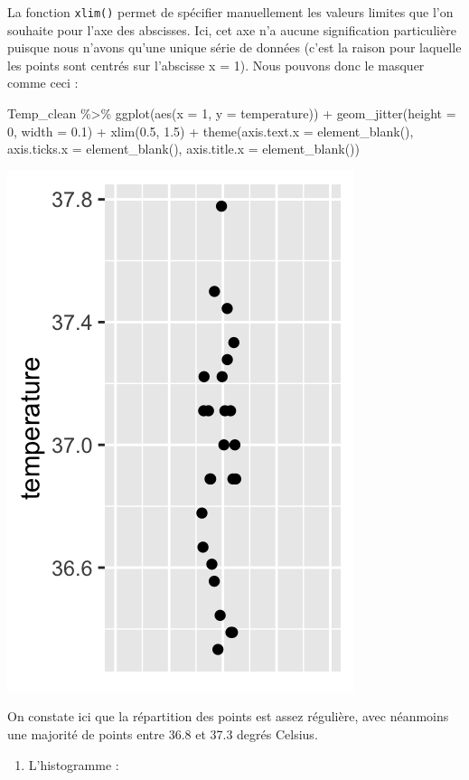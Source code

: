\documentclass[
  a4paper,
]{article}
\newenvironment{Shaded}{\begin{snugshade}}{\end{snugshade}}
\newcommand{\AttributeTok}[1]{\textcolor[rgb]{0.00,0.34,0.68}{#1}}
\newcommand{\DecValTok}[1]{\textcolor[rgb]{0.69,0.50,0.00}{#1}}
\newcommand{\FloatTok}[1]{\textcolor[rgb]{0.69,0.50,0.00}{#1}}
\newcommand{\FunctionTok}[1]{\textcolor[rgb]{0.39,0.29,0.61}{#1}}
\newcommand{\NormalTok}[1]{\textcolor[rgb]{0.12,0.11,0.11}{#1}}
\newcommand{\SpecialCharTok}[1]{\textcolor[rgb]{0.24,0.68,0.91}{#1}}
\providecommand{\tightlist}{%
  \setlength{\itemsep}{0pt}\setlength{\parskip}{0pt}}
\begin{document}
La fonction \texttt{xlim()} permet de spécifier manuellement les valeurs limites que l'on souhaite pour l'axe des abscisses. Ici, cet axe n'a aucune signification particulière puisque nous n'avons qu'une unique série de données (c'est la raison pour laquelle les points sont centrés sur l'abscisse x = 1). Nous pouvons donc le masquer comme ceci :

\begin{Shaded}
\begin{Highlighting}[]
\NormalTok{Temp\_clean }\SpecialCharTok{\%\textgreater{}\%} 
  \FunctionTok{ggplot}\NormalTok{(}\FunctionTok{aes}\NormalTok{(}\AttributeTok{x =} \DecValTok{1}\NormalTok{, }\AttributeTok{y =}\NormalTok{ temperature)) }\SpecialCharTok{+}
  \FunctionTok{geom\_jitter}\NormalTok{(}\AttributeTok{height =} \DecValTok{0}\NormalTok{, }\AttributeTok{width =} \FloatTok{0.1}\NormalTok{) }\SpecialCharTok{+}
  \FunctionTok{xlim}\NormalTok{(}\FloatTok{0.5}\NormalTok{, }\FloatTok{1.5}\NormalTok{) }\SpecialCharTok{+}
  \FunctionTok{theme}\NormalTok{(}\AttributeTok{axis.text.x =} \FunctionTok{element\_blank}\NormalTok{(),}
        \AttributeTok{axis.ticks.x =} \FunctionTok{element\_blank}\NormalTok{(),}
        \AttributeTok{axis.title.x =} \FunctionTok{element\_blank}\NormalTok{())}
\end{Highlighting}
\end{Shaded}

\begin{center}\includegraphics[width=0.25\linewidth]{figure/unnamed-chunk-17-1} \end{center}

On constate ici que la répartition des points est assez régulière, avec néanmoins une majorité de points entre 36.8 et 37.3 degrés Celsius.

\begin{enumerate}
\def\labelenumi{\arabic{enumi}.}
\setcounter{enumi}{1}
\tightlist
\item
  L'histogramme :
\end{enumerate}
\end{document}
